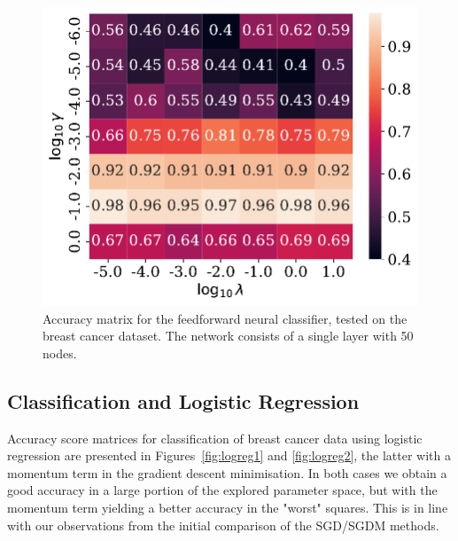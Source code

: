 \documentclass[a4paper, 
amsfonts, 
amssymb, 
amsmath, 
reprint, 
showkeys, 
nofootinbib, 
twoside]{revtex4-2}
\begin{document}
\begin{figure}
    \centering
    \includegraphics[width = \columnwidth]{Figures/logreg.pdf}
    \caption{Accuracy matrix for the feedforward neural classifier, tested on the breast cancer dataset. The network consists of a single layer with 50 nodes.}
    \label{fig:nn3}
\end{figure}

\subsection{Classification and Logistic Regression}

Accuracy score matrices for classification of breast cancer data using logistic regression are presented in Figures~\ref{fig:logreg1} and \ref{fig:logreg2}, the latter with a momentum term in the gradient descent minimisation. In both cases we obtain a good accuracy in a large portion of the explored parameter space, but with the momentum term yielding a better accuracy in the "worst" squares. This is in line with our observations from the initial comparison of the SGD/SGDM methods. 
\end{document}
